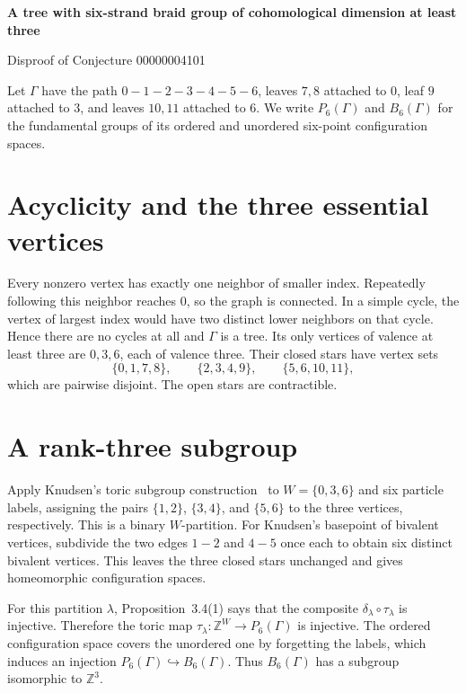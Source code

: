 \documentclass[10pt]{article}
\begin{document}
\begin{center}
  {\Large\bfseries A tree with six-strand braid group of cohomological dimension at least three\par}
  \smallskip
  Disproof of Conjecture 00000004101
\end{center}

Let $\Gamma$ have the path $0-1-2-3-4-5-6$, leaves $7,8$ attached
to $0$, leaf $9$ attached to $3$, and leaves $10,11$ attached to $6$.
We write $P_6(\Gamma)$ and $B_6(\Gamma)$ for the fundamental groups
of its ordered and unordered six-point configuration spaces.

\section*{Acyclicity and the three essential vertices}

Every nonzero vertex has exactly one neighbor of smaller index. Repeatedly
following this neighbor reaches $0$, so the graph is connected. In a
simple cycle, the vertex of largest index would have two distinct lower
neighbors on that cycle. Hence there are no cycles at all and $\Gamma$ is
a tree. Its only vertices of valence at least three are $0,3,6$, each of
valence three. Their closed stars have vertex sets
\[
 \{0,1,7,8\},\qquad \{2,3,4,9\},\qquad \{5,6,10,11\},
\]
which are pairwise disjoint. The open stars are contractible.

\section*{A rank-three subgroup}

Apply Knudsen's toric subgroup construction~\cite[Proposition~3.4(1)]{knudsen}
to $W=\{0,3,6\}$ and six particle labels, assigning the pairs $\{1,2\}$,
$\{3,4\}$, and $\{5,6\}$ to the three vertices, respectively. This is a
binary $W$-partition. For Knudsen's basepoint of bivalent vertices,
subdivide the two edges $1-2$ and $4-5$ once each to obtain six distinct
bivalent vertices. This leaves the three
closed stars unchanged and gives homeomorphic configuration spaces.

For this partition $\lambda$, Proposition~3.4(1) says that the composite
$\delta_\lambda\circ\tau_\lambda$ is injective. Therefore the toric map
$\tau_\lambda\colon\mathbb Z^W\to P_6(\Gamma)$ is injective. The ordered
configuration space covers the unordered one by forgetting the labels,
which induces an injection $P_6(\Gamma)\hookrightarrow B_6(\Gamma)$.
Thus $B_6(\Gamma)$ has a subgroup isomorphic to $\mathbb Z^3$.
\end{document}
